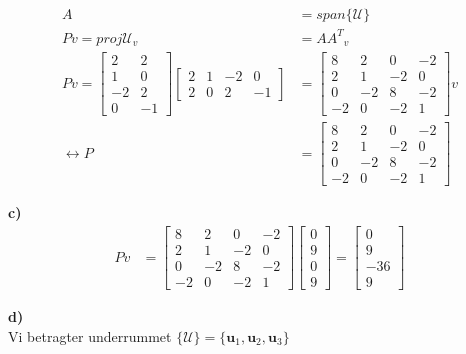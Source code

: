 \documentclass[12pt]{article}
\begin{document}
{\begin{align*}
A &= span \{  \mathcal{U} \} \\
Pv = proj  \mathcal{U}_v &= {AA^T}_v \\
Pv =
\begin{bmatrix}
2 & 2 \\ 1 & 0 \\ -2 & 2 \\ 0 & -1
\end{bmatrix}
\begin{bmatrix}
2 & 1 & -2 & 0\\ 2 & 0 & 2 & -1
\end{bmatrix}
& = \begin{bmatrix}
 8 &  2 &  0 & -2\\
 2 &  1 & -2 &  0\\
 0 & -2 &  8 & -2\\
-2 &  0 & -2 &  1
\end{bmatrix}v\\
\leftrightarrow P &= \begin{bmatrix}
 8 &  2 &  0 & -2\\
 2 &  1 & -2 &  0\\
 0 & -2 &  8 & -2\\
-2 &  0 & -2 &  1
\end{bmatrix}
\end{align*}

\textbf{c)}\\
\begin{align*}
Pv &=
\begin{bmatrix}
 8 &  2 &  0 & -2\\
 2 &  1 & -2 &  0\\
 0 & -2 &  8 & -2\\
-2 &  0 & -2 &  1
\end{bmatrix} 
\begin{bmatrix}
0 \\9 \\ 0\\9
\end{bmatrix} = 
\begin{bmatrix}
0 \\ 9 \\-36 \\9
\end{bmatrix}
\end{align*}

\textbf{d)}\\

Vi betragter underrummet $\{ \mathcal{U} \} = \{\textbf{u}_1, \textbf{u}_2, \textbf{u}_3\}$\\

}
\end{document}
